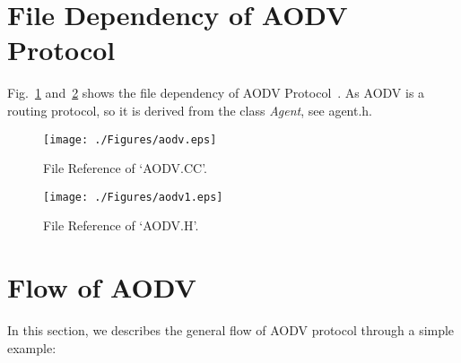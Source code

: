 \documentclass[times,10pt,onecolumn]{article}
\begin{document}
\section{File Dependency of AODV Protocol}
\label{dep}
Fig.~\ref{fig0} and~\ref{fig1} shows the file dependency of AODV Protocol~\cite{ref}. As AODV is a routing protocol, so it is derived from the class {\it Agent}, see agent.h.

\begin{figure}[htbp]
    \begin{center}
    \texttt{[image: ./Figures/aodv.eps]}
\vspace{-0.4cm} \caption{File Reference of `AODV.CC'. \vspace{-1.5cm}} 
    \label{fig0}
\end{center}
\end{figure}

\begin{figure}[htbp]
    \begin{center}
    \texttt{[image: ./Figures/aodv1.eps]}
\vspace{-0.4cm} \caption{File Reference of `AODV.H'.} \vspace{-0.7cm} 
    \label{fig1}
\end{center}
\end{figure}

\section{Flow of AODV}
\label{sec:flow}

In this section, we describes the general flow of AODV protocol through a simple example:
\end{document}
